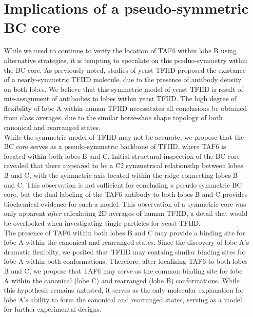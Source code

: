 \section{Implications of a pseudo-symmetric BC core}

\indent While we need to continue to verify the location of TAF6 within lobe B using alternative strategies, it is tempting to speculate on this pseduo-symmetry within the BC core. As previously noted, studies of yeast TFIID proposed the existance of a nearly-symmetric TFIID molecule, due to the presence of antibody density on both lobes. We believe that this symmetric model of yeast TFIID is result of mis-assignment of antibodies to lobes within yeast TFIID. The high degree of flexibility of lobe A within human TFIID necessitates all conclusions be obtained from class averages, due to the similar horse-shoe shape topology of both canonical and rearranged states. \\
\indent While the symmetric model of TFIID may not be accurate, we propose that the BC core serves as a pseudo-symmetric backbone of TFIID, where TAF6 is located within both lobes B and C. Initial structural inspection of the BC core revealed that there appeared to be a C2 symmetrical relationsihp between lobes B and C, with the symmetric axis located within the ridge connecting lobes B and C. This observation is not sufficient for concluding a pseudo-symmetric BC core, but the dual labeling of the TAF6 antibody to both lobes B and C provides biochemical evidence for such a model. This observation of a symmetric core was only apparent \emph{after} calculating 2D averages of human TFIID, a detail that would be overlooked when investigating single particles for yeast TFIID.\\  
\indent The presence of TAF6 within both lobes B and C may provide a binding site for lobe A within the canonical and rearranged states. Since the discovery of lobe A's dramatic flexibilty, we posited that TFIID may containg similar binding sites for lobe A within both conformations. Therefore, after localizing TAF6 to both lobes B and C, we propose that TAF6 may serve as the common binding site for lobe A within the canonical (lobe C) and rearranged (lobe B) conformations. While this hypothesis remains untested, it serves as the only molecular explanation for lobe A's ability to form the canonical and rearranged states, serving as a model for further experimental designs.\\
